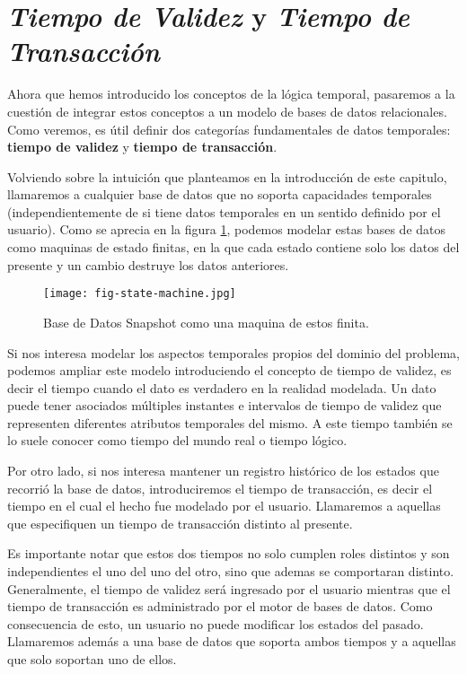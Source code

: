 \section{\textit{Tiempo de Validez} y \textit{Tiempo de Transacción}} \label{sec:val:trans}

Ahora que hemos introducido los conceptos de la lógica temporal,
pasaremos a la cuestión de integrar estos conceptos a un modelo de bases de datos relacionales.
Como veremos, es útil definir dos categorías fundamentales de datos temporales:
\textbf{tiempo de validez} y \textbf{tiempo de transacción}.

Volviendo sobre la intuición que planteamos en la introducción de este capitulo, llamaremos  a cualquier base de datos
que no soporta capacidades temporales (independientemente de si tiene datos temporales en un sentido definido por el usuario).
Como se aprecia en la figura \ref{fig:state-machine}, podemos modelar estas bases de datos como maquinas de estado finitas, en la que cada
estado contiene solo los datos del presente y un cambio destruye los datos anteriores.

\begin{figure}
    \centering
    \texttt{[image: fig-state-machine.jpg]}
    \caption{Base de Datos Snapshot como una maquina de estos finita.}
    \label{fig:state-machine}
\end{figure}

Si nos interesa modelar los aspectos temporales propios del dominio del problema,
podemos ampliar este modelo introduciendo el concepto de tiempo de validez,
es decir el tiempo cuando el dato es verdadero en la realidad modelada.
Un dato puede tener asociados múltiples instantes e intervalos de tiempo de validez que representen diferentes atributos temporales del mismo.
A este tiempo también se lo suele conocer como tiempo del mundo real o tiempo lógico.

Por otro lado, si nos interesa mantener un registro histórico de los estados que recorrió la base de datos,
introduciremos el tiempo de transacción, es decir el tiempo en el cual el hecho fue modelado por el usuario.
Llamaremos  a aquellas que especifiquen un tiempo de transacción distinto al presente.

Es importante notar que estos dos tiempos no solo cumplen roles distintos y son independientes el uno del uno del otro,
sino que ademas se comportaran distinto.
Generalmente, el tiempo de validez será ingresado por el usuario mientras que
el tiempo de transacción es administrado por el motor de bases de datos.
Como consecuencia de esto, un usuario no puede modificar los estados del pasado.
Llamaremos además  a una base de datos que soporta ambos tiempos
y  a aquellas que solo soportan uno de ellos.

